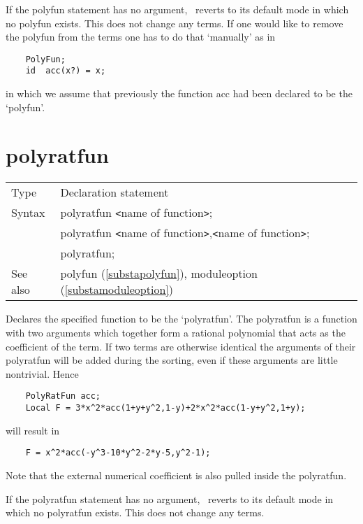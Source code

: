 \noindent If the polyfun statement has no argument, \FORM\ reverts to its 
default mode in which no polyfun exists. This does not change any terms. If 
one would like to remove the polyfun from the terms one has to do that 
`manually' as in
\begin{verbatim}
    PolyFun;
    id  acc(x?) = x;
\end{verbatim}
in which we assume that previously the function acc had been declared to be 
the `polyfun'. \vspace{10mm}


\section{polyratfun}
\label{substapolyratfun}

\noindent \begin{tabular}{ll}
Type & Declaration statement\\
Syntax & polyratfun {\tt<}name of function{\tt>}; \\
       & polyratfun {\tt<}name of function{\tt>},{\tt<}name of function{\tt>}; \\
       & polyratfun;
\\ See also & polyfun (\ref{substapolyfun}),
			  moduleoption (\ref{substamoduleoption})
\end{tabular}\vspace{4mm}

\noindent Declares the specified function to be the 
`polyratfun'. The polyratfun is a function with two 
arguments which together form a rational polynomial that 
acts as the 
coefficient of the term. If two terms are otherwise 
identical the arguments of their polyratfun will be added during the sorting, 
even if these arguments are little nontrivial. Hence
\begin{verbatim}
    PolyRatFun acc;
    Local F = 3*x^2*acc(1+y+y^2,1-y)+2*x^2*acc(1-y+y^2,1+y);
\end{verbatim}
will result in
\begin{verbatim}
    F = x^2*acc(-y^3-10*y^2-2*y-5,y^2-1);
\end{verbatim}
Note that the external numerical coefficient is also 
pulled inside the polyratfun.

\noindent If the polyratfun statement has no argument, \FORM\ reverts to its 
default mode in which no polyratfun exists. This does not change any terms.

